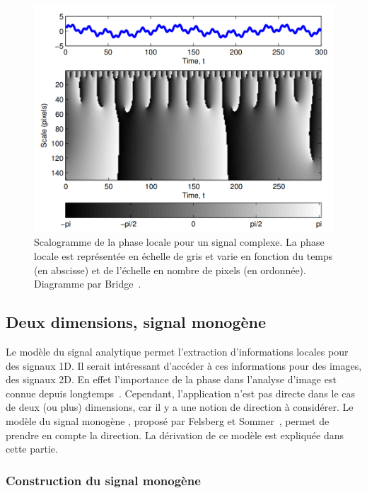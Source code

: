 \begin{figure}
    \centering
    \includegraphics[width=\textwidth]{contenu/resources/images/scalogram}
    \caption[Scalogramme de la phase locale]{Scalogramme de la phase locale pour un signal complexe. La phase locale est représentée en échelle de gris et varie en fonction du temps (en abscisse) et de l'échelle en nombre de pixels (en ordonnée). Diagramme par Bridge~\cite{bridge_introduction_2018}.}
    \label{fig:scalogram}
\end{figure}


\subsection{Deux dimensions, signal monogène}

Le modèle du signal analytique permet l'extraction d'informations locales pour des signaux 1D. Il serait intéressant d'accéder à ces informations pour des images, des signaux 2D. En effet l'importance de la phase dans l'analyse d'image est connue depuis longtemps~\cite{oppenheim_importance_1981}. Cependant, l'application n'est pas directe dans le cas de deux (ou plus) dimensions, car il y a une notion de direction à considérer. Le modèle du \og signal monogène \fg, proposé par Felsberg et Sommer~\cite{felsberg_monogenic_2001}, permet de prendre en compte la direction. La dérivation de ce modèle est expliquée dans cette partie.

\subsubsection{Construction du signal monogène}

